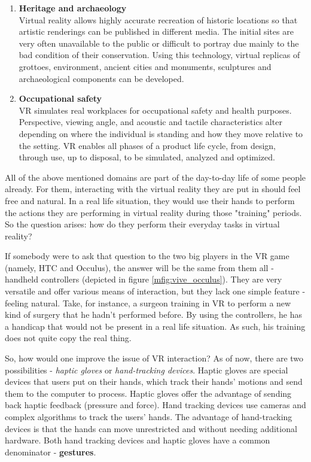 \documentclass[12pt,a4paper,twoside]{report}
\begin{document}
\begin{enumerate}
  \item \textbf{Heritage and archaeology} \\
    Virtual reality allows highly accurate recreation of historic locations so that artistic renderings can be published in different media. The initial sites are very often unavailable to the public or difficult to portray due mainly to the bad condition of their conservation. Using this technology, virtual replicas of grottoes, environment, ancient cities and monuments, sculptures and archaeological components can be developed. \cite{Heritage}

  \item \textbf{Occupational safety} \\
    VR simulates real workplaces for occupational safety and health purposes. Perspective, viewing angle, and acoustic and tactile characteristics alter depending on where the individual is standing and how they move relative to the setting. VR enables all phases of a product life cycle, from design, through use, up to disposal, to be simulated, analyzed and optimized. 
\end{enumerate}

All of the above mentioned domains are part of the day-to-day life of some people already. For them, interacting with the virtual reality they are put in should feel free and natural. In a real life situation, they would use their hands to perform the actions they are performing in virtual reality during those "training" periods. So the question arises: how do they perform their everyday tasks in virtual reality?

If somebody were to ask that question to the two big players in the VR game (namely, HTC and Occulus), the answer will be the same from them all - handheld controllers (depicted in figure \ref{mfig:vive_occulus}). They are very versatile and offer various means of interaction, but they lack one simple feature - feeling natural. Take, for instance, a surgeon training in VR to perform a new kind of surgery that he hadn't performed before. By using the controllers, he has a handicap that would not be present in a real life situation. As such, his training does not quite copy the real thing.

So, how would one improve the issue of VR interaction? As of now, there are two possibilities - \textit{haptic gloves} or \textit{hand-tracking devices}. Haptic gloves are special devices that users put on their hands, which track their hands' motions and send them to the computer to process. Haptic gloves offer the advantage of sending back haptic feedback (pressure and force). Hand tracking devices use cameras and complex algorithms to track the users' hands. The advantage of hand-tracking devices is that the hands can move unrestricted and without needing additional hardware. Both hand tracking devices and haptic gloves have a common denominator - \textbf{gestures}.
\end{document}
